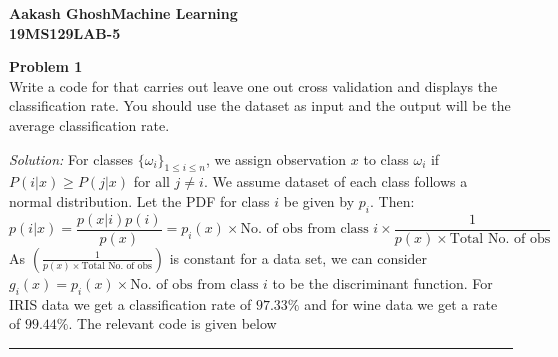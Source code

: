 \documentclass[a4paper, 11pt]{article}
\newenvironment{problem}[2][Problem]
    { \begin{mdframed}[backgroundcolor=gray!20] \textbf{#1 #2} \\}
    {  \end{mdframed}}
\newenvironment{solution}
    {\textit{Solution:}}
    {}
\begin{document}
\noindent
\textbf{Aakash Ghosh\hfill Machine Learning\\
19MS129\hfill LAB-5\\}
\begin{problem}{1}
    Write a code for that carries out leave one out cross validation
    and displays the classification rate. You should use the dataset
    as input and the output will be the average classification rate.
\end{problem}
\begin{solution}
For classes $\{\omega_i\}_{1\leq i\leq n}$, we assign observation $x$ to class $\omega_i$ if $P(i|x)\geq P(j|x)$ for all $j\ne i$. We assume dataset of each class follows a normal distribution. Let the PDF for class $i$ be given by $p_i$. Then:
$$p(i|x)=\frac{p(x|i)p(i)}{p(x)}=p_i(x)\times\text{No. of obs from class $i$}\times\frac{1}{p(x)\times\text{Total No. of obs}}$$  
\end{solution} 
As $\left(\frac{1}{p(x)\times\text{Total No. of obs}}\right)$ is constant for a data set, we can consider $g_i(x)=p_i(x)\times\text{No. of obs from class $i$}$ to be the discriminant function. For IRIS data we get a classification rate of $97.33\%$ and for wine data we get a rate of $99.44\%$. The relevant code is given below


\noindent\rule{7in}{2.8pt}
\end{document}
